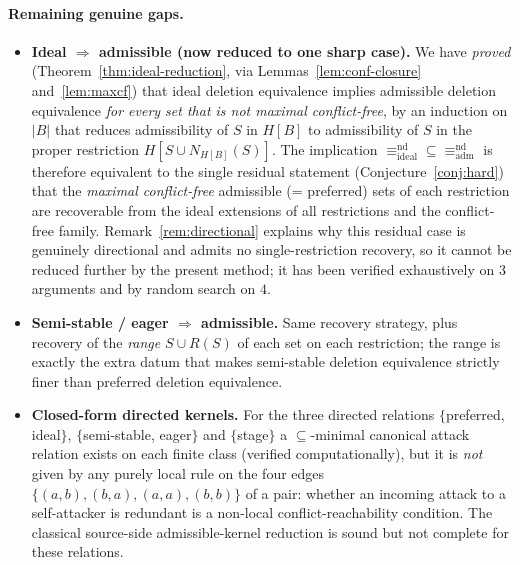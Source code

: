 \documentclass{amsart}
\theoremstyle{remark}
\begin{document}
\paragraph{Remaining genuine gaps.}
\begin{itemize}
\item \textbf{Ideal $\Rightarrow$ admissible (now reduced to one sharp case).}
We have \emph{proved} (Theorem~\ref{thm:ideal-reduction}, via
Lemmas~\ref{lem:conf-closure} and~\ref{lem:maxcf}) that ideal deletion
equivalence implies admissible deletion equivalence \emph{for every set that is
not maximal conflict-free}, by an induction on $|B|$ that reduces admissibility
of $S$ in $H[B]$ to admissibility of $S$ in the proper restriction
$H[S\cup N_{H[B]}(S)]$.  The implication $\equiv^{\mathrm{nd}}_{\mathrm{ideal}}
\subseteq\equiv^{\mathrm{nd}}_{\mathrm{adm}}$ is therefore equivalent to the
single residual statement (Conjecture~\ref{conj:hard}) that the
\emph{maximal conflict-free} admissible (= preferred) sets of each restriction
are recoverable from the ideal extensions of all restrictions and the
conflict-free family.  Remark~\ref{rem:directional} explains why this residual
case is genuinely directional and admits no single-restriction recovery, so it
cannot be reduced further by the present method; it has been verified
exhaustively on $3$ arguments and by random search on $4$.

\item \textbf{Semi-stable / eager $\Rightarrow$ admissible.}  Same recovery
strategy, plus recovery of the \emph{range} $S\cup R(S)$ of each set on each
restriction; the range is exactly the extra datum that makes semi-stable
deletion equivalence strictly finer than preferred deletion equivalence.
\item \textbf{Closed-form directed kernels.}  For the three directed relations
$\{$preferred, ideal$\}$, $\{$semi-stable, eager$\}$ and $\{$stage$\}$ a
$\subseteq$-minimal canonical attack relation exists on each finite class
(verified computationally), but it is \emph{not} given by any purely local rule
on the four edges $\{(a,b),(b,a),(a,a),(b,b)\}$ of a pair: whether an incoming
attack to a self-attacker is redundant is a non-local conflict-reachability
condition.  The classical source-side admissible-kernel reduction is sound but
not complete for these relations.
\end{itemize}
\end{document}
